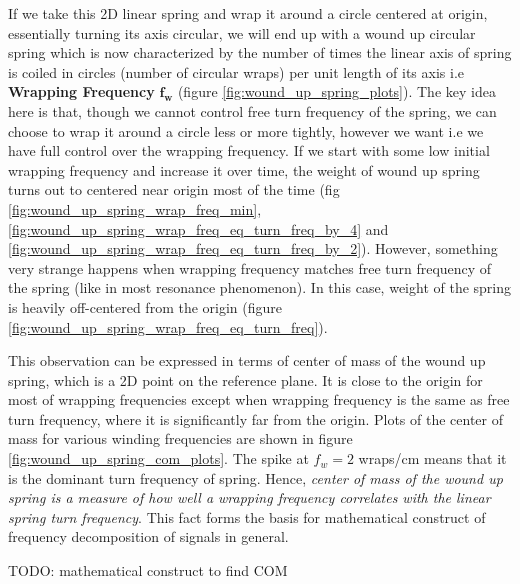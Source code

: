 \documentclass[11pt, a4paper]{article}
\begin{document}
If we take this 2D linear spring and wrap it around a circle centered at origin, essentially turning its axis circular, we will end up with a wound up circular spring which is now characterized by the number of times the linear axis of spring is coiled in circles (number of circular wraps) per unit length of its axis i.e \textbf{Wrapping Frequency} $\boldsymbol{f_{w}}$ (figure \ref{fig:wound_up_spring_plots}). The key idea here is that, though we cannot control free turn frequency of the spring, we can choose to wrap it around a circle less or more tightly, however we want i.e we have full control over the wrapping frequency. If we start with some low initial wrapping frequency and increase it over time, the weight of wound up spring turns out to centered near origin most of the time (fig \ref{fig:wound_up_spring_wrap_freq_min}, \ref{fig:wound_up_spring_wrap_freq_eq_turn_freq_by_4} and \ref{fig:wound_up_spring_wrap_freq_eq_turn_freq_by_2}). However, something very strange happens when wrapping frequency matches free turn frequency of the spring (like in most resonance phenomenon). In this case, weight of the spring is heavily off-centered from the origin (figure \ref{fig:wound_up_spring_wrap_freq_eq_turn_freq}).

This observation can be expressed in terms of center of mass of the wound up spring, which is a 2D point on the reference plane. It is close to the origin for most of wrapping frequencies except when wrapping frequency is the same as free turn frequency, where it is significantly far from the origin. Plots of the center of mass for various winding frequencies are shown in figure \ref{fig:wound_up_spring_com_plots}. The spike at $f_{w} = 2$ wraps/cm means that it is the dominant turn frequency of spring. Hence, \textit{center of mass of the wound up spring is a measure of how well a wrapping frequency correlates with the linear spring turn frequency}. This fact forms the basis for mathematical construct of frequency decomposition of signals in general.

TODO: mathematical construct to find COM
\end{document}
